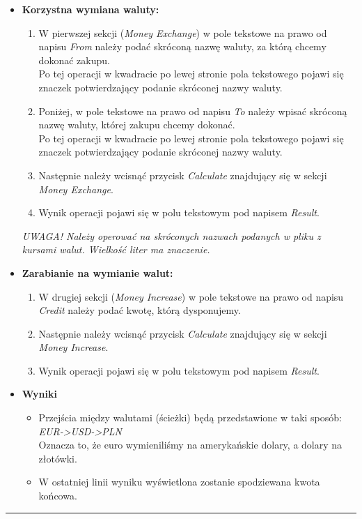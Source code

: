 \documentclass[a4paper,11pt]{article}
\newcommand{\linia}{\rule{\linewidth}{0.4mm}}
\begin{document}
\begin{itemize}
\item  \textbf{Korzystna wymiana waluty:}
\begin{enumerate}
\item W pierwszej sekcji (\textit{Money Exchange}) w pole tekstowe na prawo od napisu \textit{From} należy podać skróconą nazwę waluty, za którą chcemy dokonać zakupu.
\\ Po tej operacji w kwadracie po lewej stronie pola tekstowego pojawi się znaczek potwierdzający podanie skróconej nazwy waluty.
\item Poniżej, w pole tekstowe na prawo od napisu \textit{To} należy wpisać skróconą nazwę waluty, której zakupu chcemy dokonać.
\\ Po tej operacji w kwadracie po lewej stronie pola tekstowego pojawi się znaczek potwierdzający podanie skróconej nazwy waluty.
\item Następnie należy wcisnąć przycisk \textit{Calculate} znajdujący się w sekcji \textit{Money Exchange}.
\item Wynik operacji pojawi się w polu tekstowym pod napisem \textit{Result}.
\end{enumerate}
\textit{UWAGA! Należy operować na skróconych nazwach podanych w pliku z kursami walut. Wielkość liter ma znaczenie.}
\item  \textbf{Zarabianie na wymianie walut:}
\begin{enumerate}
\item W drugiej sekcji (\textit{Money Increase}) w pole tekstowe na prawo od napisu \textit{Credit} należy podać kwotę, którą dysponujemy.
\item Następnie należy wcisnąć przycisk \textit{Calculate} znajdujący się w sekcji \textit{Money Increase}.
\item Wynik operacji pojawi się w polu tekstowym pod napisem \textit{Result}.
\end{enumerate}
\item\textbf{ Wyniki}
\begin{itemize}
\item Przejścia między walutami (ścieżki) będą przedstawione w taki sposób: \emph{EUR->USD->PLN}
\\Oznacza to, że euro wymieniliśmy na amerykańskie dolary, a dolary na złotówki.
\item W ostatniej linii wyniku wyświetlona zostanie spodziewana kwota końcowa.
\end{itemize}
\end{itemize}

\noindent\linia
\end{document}
